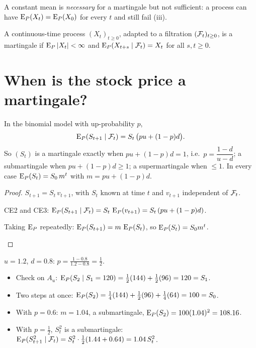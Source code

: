 A constant mean is \emph{necessary} for a martingale but not sufficient: a process can have $\operatorname{E}_P(X_t)=\operatorname{E}_P(X_0)$ for every $t$ and still fail (iii).

\begin{definition}
\label{def:mg-cont}
A continuous-time process $(X_t)_{t\ge0}$, adapted to a filtration $(\mathcal F_t)_{t\ge0}$, is a martingale if $\operatorname{E}_P|X_t|<\infty$ and $\operatorname{E}_P(X_{t+s}\mid\mathcal F_t)=X_t$ for all $s,t\ge0$.
\end{definition}

\section{When is the stock price a martingale?}

\begin{result}
\label{res:binomial-mg}
In the binomial model with up-probability $p$,
\[
  \operatorname{E}_P(S_{t+1}\mid\mathcal F_t)=S_t\,\big(pu+(1-p)d\big).
\]
So $(S_t)$ is a martingale exactly when $pu+(1-p)d=1$, i.e.\ $p=\dfrac{1-d}{u-d}$; a submartingale when $pu+(1-p)d\ge1$; a supermartingale when $\le1$. In every case $\operatorname{E}_P(S_t)=S_0\,m^t$ with $m=pu+(1-p)d$.
\end{result}
\begin{proof}
$S_{t+1}=S_t\,v_{t+1}$, with $S_t$ known at time $t$ and $v_{t+1}$ independent of $\mathcal F_t$.
\begin{steps}
  \item CE2 and CE3: $\operatorname{E}_P(S_{t+1}\mid\mathcal F_t)=S_t\,\operatorname{E}_P(v_{t+1})=S_t\,(pu+(1-p)d)$.
  \item Taking $\operatorname{E}_P$ repeatedly: $\operatorname{E}_P(S_{t+1})=m\,\operatorname{E}_P(S_t)$, so $\operatorname{E}_P(S_t)=S_0m^t$. \qedhere
\end{steps}
\end{proof}

\begin{example}
$u=1.2$, $d=0.8$: $p=\frac{1-0.8}{1.2-0.8}=\frac12$.
\begin{itemize}
  \item Check on $A_u$: $\operatorname{E}_P(S_2\mid S_1=120)=\frac12(144)+\frac12(96)=120=S_1$.
  \item Two steps at once: $\operatorname{E}_P(S_2)=\frac14(144)+\frac12(96)+\frac14(64)=100=S_0$.
  \item With $p=0.6$: $m=1.04$, a submartingale, $\operatorname{E}_P(S_2)=100(1.04)^2=108.16$.
  \item With $p=\frac12$, $S_t^2$ is a submartingale: $\operatorname{E}_P(S_{t+1}^2\mid\mathcal F_t)=S_t^2\cdot\frac12(1.44+0.64)=1.04\,S_t^2$.
\end{itemize}
\end{example}

